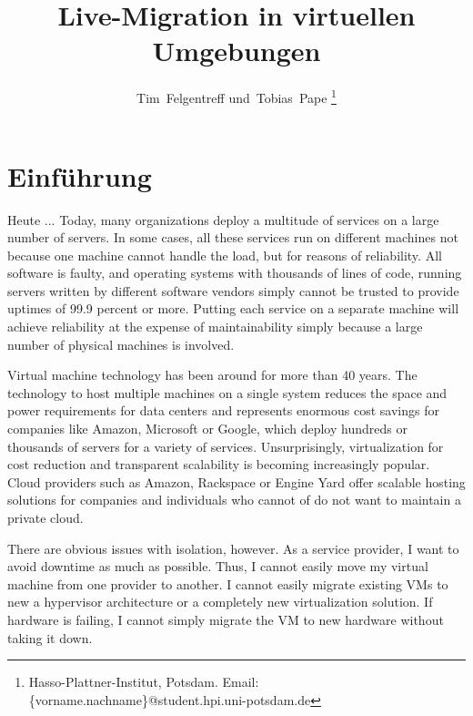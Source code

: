 \documentclass[journal]{IEEEtran}
\title{Live-Migration in virtuellen Umgebungen}
\author{\IEEEauthorblockN{Tim Felgentreff und Tobias Pape}
  \IEEEauthorblockA{Hasso-Plattner-Institut\\
    Potsdam, Germany\\
    Email: \{vorname.nachname\}@student.hpi.uni-potsdam.de}%
}
\author{Tim~Felgentreff und~Tobias~Pape%
\thanks{%
  Hasso-Plattner-Institut, Potsdam.\goodbreak
  Email: \{vorname.nachname\}@student.hpi.uni-potsdam.de}%
}
\begin{document}
\maketitle

\begin{abstract}
  
\end{abstract}

\IEEEpeerreviewmaketitle


\section{Einführung}
\label{sec:einfuehrung}
Heute ...
Today, many organizations deploy a multitude of services on a large
number of servers. In some cases, all these services run on different
machines not because one machine cannot handle the load, but for
reasons of reliability.  All software is faulty\cite{zellerprograms},
and operating systems with thousands of lines of code, running servers
written by different software vendors simply cannot be trusted to
provide uptimes of 99.9 percent or more. Putting each service on a
separate machine will achieve reliability at the expense of
maintainability simply because a large number of physical machines is
involved.

Virtual machine technology has been around for more than 40
years\cite{tanenbaum1992modern}. The technology to host multiple
machines on a single system reduces the space and power requirements
for data centers and represents enormous cost savings for companies
like Amazon, Microsoft or Google, which deploy hundreds or thousands
of servers for a variety of services. Unsurprisingly, virtualization
for cost reduction and transparent scalability is becoming
increasingly popular. Cloud providers such as Amazon, Rackspace or
Engine Yard offer scalable hosting solutions for companies and
individuals who cannot of do not want to maintain a private cloud.

There are obvious issues with isolation, however. As a service
provider, I want to avoid downtime as much as possible. Thus, I cannot
easily move my virtual machine from one provider to another. I cannot
easily migrate existing VMs to new a hypervisor architecture or a
completely new virtualization solution. If hardware is failing, I
cannot simply migrate the VM to new hardware without taking it down.
\end{document}
